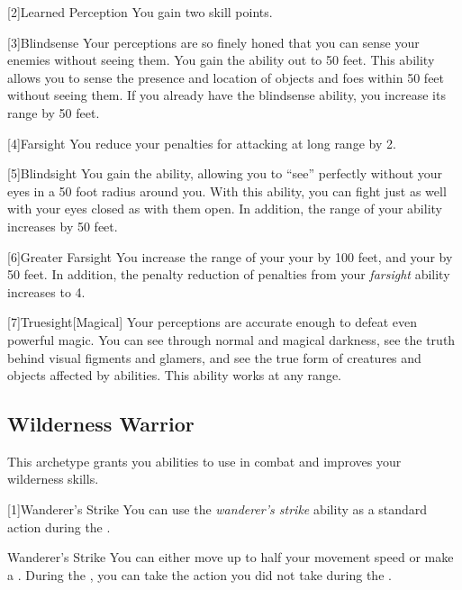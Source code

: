         [2]{Learned Perception} You gain two skill points.

        [3]{Blindsense}
        Your perceptions are so finely honed that you can sense your enemies without seeing them.
        You gain the  ability out to 50 feet.
        This ability allows you to sense the presence and location of objects and foes within 50 feet without seeing them.
        If you already have the blindsense ability, you increase its range by 50 feet.

        [4]{Farsight}
        You reduce your  penalties for attacking at long range by 2.

        [5]{Blindsight}
        You gain the  ability, allowing you to ``see'' perfectly without your eyes in a 50 foot radius around you.
        With this ability, you can fight just as well with your eyes closed as with them open.
        In addition, the range of your  ability increases by 50 feet.

        [6]{Greater Farsight}
        You increase the range of your your  by 100 feet, and your  by 50 feet.
        In addition, the penalty reduction of  penalties from your \textit{farsight} ability increases to 4.

        [7]{Truesight}[Magical]
        Your perceptions are accurate enough to defeat even powerful magic.
        You can see through normal and magical darkness, see the truth behind visual figments and glamers, and see the true form of creatures and objects affected by  abilities.
        This ability works at any range.

    \subsection{Wilderness Warrior}
        This archetype grants you abilities to use in combat and improves your wilderness skills.

        [1]{Wanderer's Strike} You can use the \textit{wanderer's strike} ability as a standard action during the .
        \begin{freeability}{Wanderer's Strike}
            You can either move up to half your movement speed or make a .
            During the , you can take the action you did not take during the .
        \end{freeability}

